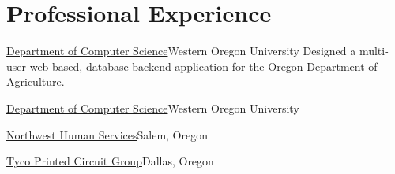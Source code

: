 \section{Professional Experience}	
		{\href{http://www.wou.edu/las/cs/index.php}{Department of Computer Science}}{Western Oregon University}{}
		{Designed a multi-user web-based, database backend application for the Oregon Department of Agriculture.}

		{\href{http://www.wou.edu/las/cs/index.php}{Department of Computer Science}}{Western Oregon University}{}{}
		
		{\href{http://www.wou.edu/las/cs/index.php}{Northwest Human Services}}{Salem, Oregon}{}{}

		{\href{http://www.tyco.com/}{Tyco Printed Circuit Group}}{Dallas, Oregon}{}{}
